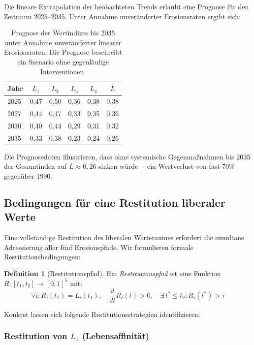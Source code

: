 ﻿\documentclass[a4paper,12pt]{article}
\theoremstyle{definition}
\newtheorem{definition}{Definition}
\begin{document}
Die lineare Extrapolation der beobachteten Trends erlaubt eine Prognose für den Zeitraum 2025--2035. Unter Annahme unveränderter Erosionsraten ergibt sich:

\begin{table}[h!]
\centering
\renewcommand{\arraystretch}{1.25}
\begin{tabular}{lccccc}
\toprule
\textbf{Jahr} & $L_1$ & $L_2$ & $L_3$ & $L_4$ & $\bar{L}$ \\
\midrule
2025 & 0{,}47 & 0{,}50 & 0{,}36 & 0{,}38 & 0{,}38 \\
2027 & 0{,}44 & 0{,}47 & 0{,}33 & 0{,}35 & 0{,}36 \\
2030 & 0{,}40 & 0{,}44 & 0{,}29 & 0{,}31 & 0{,}32 \\
2035 & 0{,}33 & 0{,}38 & 0{,}23 & 0{,}24 & 0{,}26 \\
\bottomrule
\end{tabular}
\caption{Prognose der Wertindizes bis 2035 unter Annahme unveränderter linearer Erosionsraten. Die Prognose beschreibt ein Szenario ohne gegenläufige Interventionen.}
\label{tab:prognose}
\end{table}

Die Prognosedaten illustrieren, dass ohne systemische Gegenmaßnahmen bis 2035 der Gesamtindex auf $\bar{L} \approx 0{,}26$ sinken würde~-- ein Wertverlust von fast $70\%$ gegenüber 1990.

\subsection{Bedingungen für eine Restitution liberaler Werte}

Eine vollständige Restitution des liberalen Werteraumes erfordert die simultane Adressierung aller fünf Erosionspfade. Wir formulieren formale Restitutionsbedingungen:

\begin{definition}[Restitutionspfad]
Ein \emph{Restitutionspfad} ist eine Funktion $R: [t_1, t_2] \to [0,1]^5$ mit:
\[
\forall i: R_i(t_1) = L_i(t_1), \quad \frac{d}{dt}R_i(t) > 0, \quad \exists\, t^* \leq t_2: R_i(t^*) > \tau
\]
\end{definition}

Konkret lassen sich folgende Restitutionsstrategien identifizieren:

\subsubsection{Restitution von $L_1$ (Lebensaffinität)}
\end{document}
